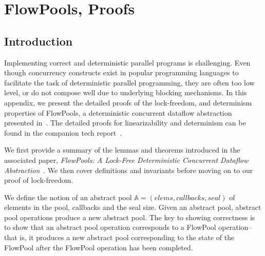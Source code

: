 \chapter{FlowPools, Proofs}
\label{appdx:flowpools}

\section{Introduction}

Implementing correct and deterministic parallel programs is challenging. Even
though concurrency constructs exist in popular programming languages to
facilitate the task of deterministic parallel programming, they are often too
low level, or do not compose well due to underlying blocking mechanisms. In this
appendix, we present the detailed proofs of the lock-freedom, and determinism
properties of FlowPools, a deterministic concurrent dataflow abstraction
presented in~\cite{FlowPools}. The detailed proofs for linearizability and
determinism can be found in the companion tech report~\cite{Prokopec12}.

We first provide a summary of the lemmas and theorems introduced in the
associated paper, \emph{FlowPools: A Lock-Free Deterministic Concurrent Dataflow
Abstraction}~\cite{FlowPools}. We then cover definitions and invariants before
moving on to our proof of lock-freedom.

We define the notion of an abstract pool $\mathbb{A} = (elems,
callbacks, seal)$ of elements in the pool, callbacks and the seal
size.
Given an abstract pool, abstract pool operations produce a new
abstract pool.
The key to showing correctness is to show that an abstract pool operation
corresponds to a FlowPool operation-- that is, it produces a
new abstract pool corresponding to the state of the FlowPool after
the FlowPool operation has been completed.



